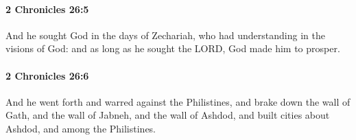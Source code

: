 		\paragraph{2 Chronicles 26:5} %
			\label{2CHRONICLES-26-5}

			And he sought God in the days of Zechariah, who had understanding in the visions of God: and as long as he sought the LORD, God made him to prosper.


		\paragraph{2 Chronicles 26:6} %
			\label{2CHRONICLES-26-6}

			And he went forth and warred against the Philistines, and brake down the wall of Gath, and the wall of Jabneh, and the wall of Ashdod, and built cities about Ashdod, and among the Philistines.


